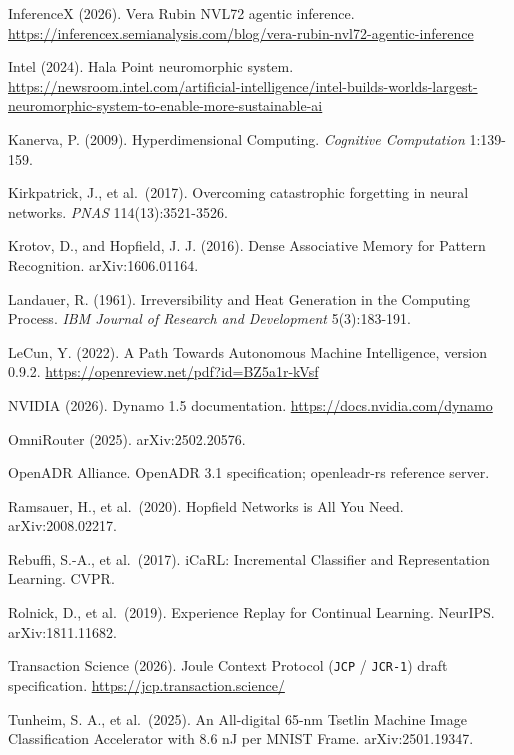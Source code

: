 \documentclass[10pt,letterpaper]{article}
\begin{document}
InferenceX (2026). Vera Rubin NVL72 agentic inference.
\url{https://inferencex.semianalysis.com/blog/vera-rubin-nvl72-agentic-inference}

Intel (2024). Hala Point neuromorphic system.
\url{https://newsroom.intel.com/artificial-intelligence/intel-builds-worlds-largest-neuromorphic-system-to-enable-more-sustainable-ai}

Kanerva, P. (2009). Hyperdimensional Computing. \emph{Cognitive
Computation} 1:139-159.

Kirkpatrick, J., et al.~(2017). Overcoming catastrophic forgetting in
neural networks. \emph{PNAS} 114(13):3521-3526.

Krotov, D., and Hopfield, J. J. (2016). Dense Associative Memory for
Pattern Recognition. arXiv:1606.01164.

Landauer, R. (1961). Irreversibility and Heat Generation in the
Computing Process. \emph{IBM Journal of Research and Development}
5(3):183-191.

LeCun, Y. (2022). A Path Towards Autonomous Machine Intelligence,
version 0.9.2. \url{https://openreview.net/pdf?id=BZ5a1r-kVsf}

NVIDIA (2026). Dynamo 1.5 documentation.
\url{https://docs.nvidia.com/dynamo}

OmniRouter (2025). arXiv:2502.20576.

OpenADR Alliance. OpenADR 3.1 specification; openleadr-rs reference
server.

Ramsauer, H., et al.~(2020). Hopfield Networks is All You Need.
arXiv:2008.02217.

Rebuffi, S.-A., et al.~(2017). iCaRL: Incremental Classifier and
Representation Learning. CVPR.

Rolnick, D., et al.~(2019). Experience Replay for Continual Learning.
NeurIPS. arXiv:1811.11682.

Transaction Science (2026). Joule Context Protocol (\texttt{JCP} /
\texttt{JCR-1}) draft specification.
\url{https://jcp.transaction.science/}

Tunheim, S. A., et al.~(2025). An All-digital 65-nm Tsetlin Machine
Image Classification Accelerator with 8.6 nJ per MNIST Frame.
arXiv:2501.19347.
\end{document}

